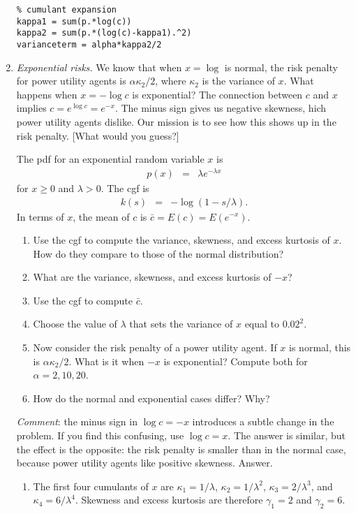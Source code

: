 \documentclass[11pt]{article}
\begin{document}
\begin{enumerate}
\begin{verbatim}
% cumulant expansion
kappa1 = sum(p.*log(c))
kappa2 = sum(p.*(log(c)-kappa1).^2)
varianceterm = alpha*kappa2/2
\end{verbatim}

\item {\it Exponential risks.\/}
We know that when $ x = \log $ is normal,
the risk penalty for power utility agents is
$ \alpha \kappa_2/2 $,
where $\kappa_2$ is the variance of $x$.
What happens when $x = - \log c $ is exponential?
The connection between $c$ and $x$ implies $c = e^{\log c} = e^{-x}$.
The minus sign gives us negative skewness,
hich power utility agents dislike.
Our mission is to see how this shows up in the risk penalty.
[What would you guess?]

The pdf for an exponential random variable $x$ is
\begin{eqnarray*}
    p(x)  &=& \lambda e^{-\lambda x}
\end{eqnarray*}
for $x \geq 0$ and $\lambda > 0$.
The cgf is
\begin{eqnarray*}
    k(s)  &=& - \log \left( 1 - s/\lambda \right) .
\end{eqnarray*}
In terms of $x$, the mean of $c$ is $\bar{c} = E(c) = E (e^{-x})$.

\begin{enumerate}
\item Use the cgf to compute the variance, skewness, and excess kurtosis
of $x$.  How do they compare to those of the normal distribution?
\item What are the variance, skewness, and excess kurtosis of $-x$?
\item Use the cgf to compute $\bar{c}$.
\item Choose the value of $\lambda$ that sets
the variance of $x$ equal to $0.02^2$.
\item Now consider the risk penalty of a power utility agent.
If $x$ is normal, this is $\alpha \kappa_2/2 $.
What is it when $-x$ is exponential?
Compute both for $\alpha = 2, 10, 20$.
\item How do the normal and exponential cases differ?  Why?
\end{enumerate}
{\it Comment\/}: the minus sign in $ \log c = -x $ introduces
a subtle change in the problem.
If you find this confusing, use $ \log c = x$.
The answer is similar, but the effect is the opposite:
the risk penalty is smaller than in the normal case, because
power utility agents like positive skewness.
%
Answer.
\begin{enumerate}
\item The first four cumulants of $x$ are
$\kappa_1 = 1/\lambda$,
$\kappa_2 = 1/\lambda^2$,
$\kappa_3 = 2/\lambda^3$,
and $\kappa_4 = 6/\lambda^4$.
Skewness and excess kurtosis are therefore
$\gamma_1 = 2$ and $\gamma_2 = 6$.


\end{enumerate}
\end{enumerate}
\end{document}
